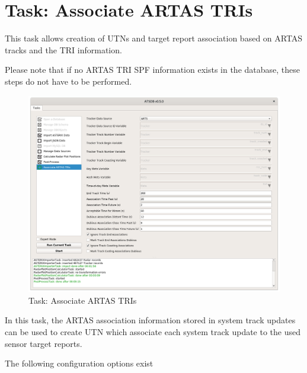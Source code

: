 \section{Task: Associate ARTAS TRIs}
\label{sec:task_associate_artas_tris}

This task allows creation of UTNs and target report association based on ARTAS tracks and the TRI information.

Please note that if no ARTAS TRI SPF information exists in the database, these steps do not have to be performed.\\

\begin{figure}[H]
  \hspace*{-2.5cm}
    \includegraphics[width=19cm]{figures/artas_association_config.png}
  \caption{Task: Associate ARTAS TRIs}
\end{figure}

In this task, the ARTAS association information stored in system track updates can be used to create UTN which associate each system track update to the used sensor target reports.

The following configuration options exist

